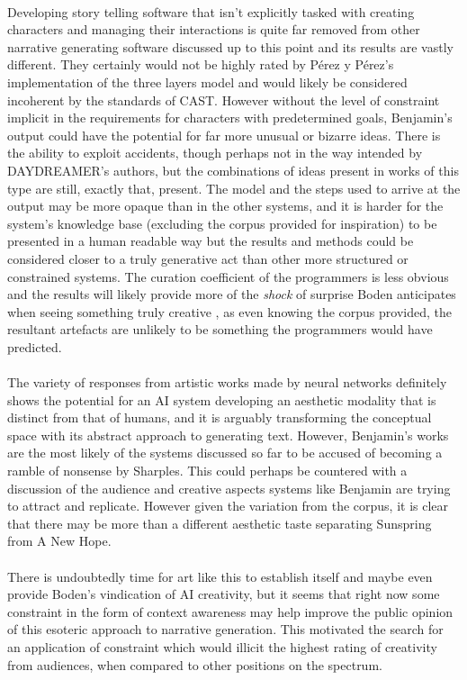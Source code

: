 \documentclass[letterpaper]{article}
\begin{document}
\\Developing story telling software that isn't explicitly tasked with creating characters and managing their interactions is quite far removed from other narrative generating software discussed up to this point and its results are vastly different. They certainly would not be highly rated by P\'erez y P\'erez's implementation of the three layers model and would likely be considered incoherent by the standards of CAST. However without the level of constraint implicit in the requirements for characters with predetermined goals, Benjamin's output could have the potential for far more unusual or bizarre ideas. There is the ability to exploit accidents, though perhaps not in the way intended by DAYDREAMER's authors, but the combinations of ideas present in works of this type are still, exactly that, present. The model and the steps used to arrive at the output may be more opaque than in the other systems, and it is harder for the system's knowledge base (excluding the corpus provided for inspiration) to be presented in a human readable way but the results and methods could be considered closer to a truly generative act than other more structured or constrained systems. The curation coefficient of the programmers is less obvious and the results will likely provide more of the \emph{shock} of surprise Boden anticipates when seeing something truly creative , as even knowing the corpus provided, the resultant artefacts are unlikely to be something the programmers would have predicted.\\
\\The variety of responses from artistic works made by neural networks definitely shows the potential for an AI system developing an aesthetic modality that is distinct from that of humans, and it is arguably transforming the conceptual space with its abstract approach to generating text. However, Benjamin's works are the most likely of the systems discussed so far to be accused of becoming a ramble of nonsense by Sharples. This could perhaps be countered with a discussion of the audience and creative aspects systems like Benjamin are trying to attract and replicate. However given the variation from the corpus, it is clear that there may be more than a different aesthetic taste separating Sunspring from A New Hope.\\
\\There is undoubtedly time for art like this to establish itself and maybe even provide Boden's vindication of AI creativity, but it seems that right now some constraint in the form of context awareness may help improve the public opinion of this esoteric approach to narrative generation. This motivated the search for an application of constraint which would illicit the highest rating of creativity from audiences, when compared to other positions on the spectrum.
\end{document}
